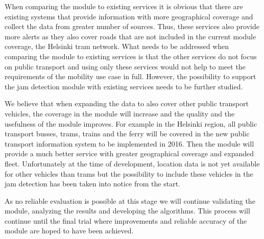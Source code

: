 When comparing the module to existing services it is obvious that
there are existing systems that provide information with more
geographical coverage and collect the data from greater number of
sources. Thus, these services also provide more alerts as they also
cover roads that are not included in the current module coverage, the
Helsinki tram network. What needs to be addressed when comparing the
module to existing services is that the other services do not focus on
public transport and using only these services would not help to meet
the requirements of the mobility use case in full. However, the
possibility to support the jam detection module with existing services
needs to be further studied. 

We believe that when expanding the data to also cover other public
transport vehicles, the coverage in the module will increase and the
quality and the usefulness of the module improves. For example in the
Helsinki region, all public transport busses, trams, trains and the
ferry will be covered in the new public transport information system
to be implemented in 2016. Then the module will provide a much better
service with greater geographical coverage and expanded
fleet. Unfortunately at the time of development, location data is not
yet available for other vehicles than trams but the possibility to
include these vehicles in the jam detection has been taken into notice
from the start.

As no reliable evaluation is possible at this stage we will continue
validating the module, analyzing the results and developing the
algorithms. This process will continue until the final trial where
improvements and reliable accuracy of the module are hoped to have
been achieved.

